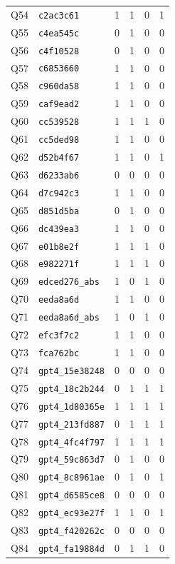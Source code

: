 \begin{longtable}{@{}clcccc@{}}
Q54 & \texttt{c2ac3c61} & 1 & 1 & 0 & 1 \\
Q55 & \texttt{c4ea545c} & 0 & 1 & 0 & 0 \\
Q56 & \texttt{c4f10528} & 0 & 1 & 0 & 0 \\
Q57 & \texttt{c6853660} & 1 & 1 & 0 & 0 \\
Q58 & \texttt{c960da58} & 1 & 1 & 0 & 0 \\
Q59 & \texttt{caf9ead2} & 1 & 1 & 0 & 0 \\
Q60 & \texttt{cc539528} & 1 & 1 & 1 & 0 \\
Q61 & \texttt{cc5ded98} & 1 & 1 & 0 & 0 \\
Q62 & \texttt{d52b4f67} & 1 & 1 & 0 & 1 \\
Q63 & \texttt{d6233ab6} & 0 & 0 & 0 & 0 \\
Q64 & \texttt{d7c942c3} & 1 & 1 & 0 & 0 \\
Q65 & \texttt{d851d5ba} & 0 & 1 & 0 & 0 \\
Q66 & \texttt{dc439ea3} & 1 & 1 & 0 & 0 \\
Q67 & \texttt{e01b8e2f} & 1 & 1 & 1 & 0 \\
Q68 & \texttt{e982271f} & 1 & 1 & 1 & 0 \\
Q69 & \texttt{edced276\_abs} & 1 & 0 & 1 & 0 \\
Q70 & \texttt{eeda8a6d} & 1 & 1 & 0 & 0 \\
Q71 & \texttt{eeda8a6d\_abs} & 1 & 0 & 1 & 0 \\
Q72 & \texttt{efc3f7c2} & 1 & 1 & 0 & 0 \\
Q73 & \texttt{fca762bc} & 1 & 1 & 0 & 0 \\
Q74 & \texttt{gpt4\_15e38248} & 0 & 0 & 0 & 0 \\
Q75 & \texttt{gpt4\_18c2b244} & 0 & 1 & 1 & 1 \\
Q76 & \texttt{gpt4\_1d80365e} & 1 & 1 & 1 & 1 \\
Q77 & \texttt{gpt4\_213fd887} & 0 & 1 & 1 & 1 \\
Q78 & \texttt{gpt4\_4fc4f797} & 1 & 1 & 1 & 1 \\
Q79 & \texttt{gpt4\_59c863d7} & 0 & 1 & 0 & 0 \\
Q80 & \texttt{gpt4\_8c8961ae} & 0 & 1 & 0 & 1 \\
Q81 & \texttt{gpt4\_d6585ce8} & 0 & 0 & 0 & 0 \\
Q82 & \texttt{gpt4\_ec93e27f} & 1 & 1 & 0 & 1 \\
Q83 & \texttt{gpt4\_f420262c} & 0 & 0 & 0 & 0 \\
Q84 & \texttt{gpt4\_fa19884d} & 0 & 1 & 1 & 0 \\
\end{longtable}

